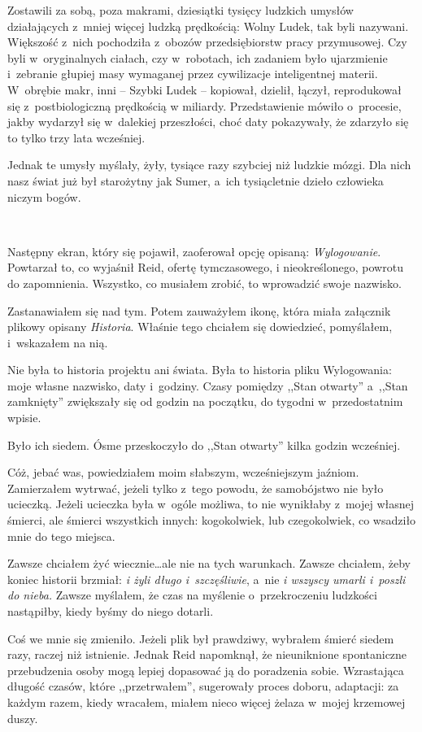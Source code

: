 \documentclass[oneside,polish,11pt,sfheadings]{mwbk}
\begin{document}
Zostawili za sobą, poza makrami, dziesiątki tysięcy ludzkich umysłów
działających z~mniej więcej ludzką prędkością: Wolny Ludek, tak byli
nazywani. Większość z~nich pochodziła z~obozów przedsiębiorstw pracy
przymusowej. Czy byli w~oryginalnych ciałach, czy w~robotach, ich
zadaniem było ujarzmienie i~zebranie głupiej masy wymaganej przez
cywilizacje inteligentnej materii. W~obrębie makr, inni -- Szybki Ludek -- kopiował, dzielił, łączył, reprodukował się z~postbiologiczną prędkością
w miliardy. Przedstawienie mówiło o~procesie, jakby wydarzył się w~dalekiej przeszłości, choć daty pokazywały, że zdarzyło się to tylko
trzy lata wcześniej.

Jednak te umysły myślały, żyły, tysiące razy szybciej niż ludzkie mózgi.
Dla nich nasz świat już był starożytny jak Sumer, a~ich tysiącletnie
dzieło człowieka niczym bogów.

~

Następny ekran, który się pojawił, zaoferował opcję opisaną:
\emph{Wylogowanie}. Powtarzał to, co wyjaśnił Reid, ofertę tymczasowego,
i nieokreślonego, powrotu do zapomnienia. Wszystko, co musiałem zrobić,
to wprowadzić swoje nazwisko.

Zastanawiałem się nad tym. Potem zauważyłem ikonę, która miała załącznik
plikowy opisany \emph{Historia}. Właśnie tego chciałem się dowiedzieć,
pomyślałem, i~wskazałem na nią.

Nie była to historia projektu ani świata. Była to historia pliku
Wylogowania: moje własne nazwisko, daty i~godziny. Czasy pomiędzy ,,Stan
otwarty'' a~,,Stan zamknięty'' zwiększały się od godzin na początku, do
tygodni w~przedostatnim wpisie.

Było ich siedem. Ósme przeskoczyło do ,,Stan otwarty'' kilka godzin
wcześniej.

Cóż, jebać was, powiedziałem moim słabszym, wcześniejszym jaźniom.
Zamierzałem wytrwać, jeżeli tylko z~tego powodu, że samobójstwo nie było
ucieczką. Jeżeli ucieczka była w~ogóle możliwa, to nie wynikłaby z~mojej
własnej śmierci, ale śmierci wszystkich innych: kogokolwiek, lub
czegokolwiek, co wsadziło mnie do tego miejsca.

Zawsze chciałem żyć wiecznie\ldots ale nie na tych warunkach. Zawsze
chciałem, żeby koniec historii brzmiał: \emph{i żyli długo i~szczęśliwie}, a~nie \emph{i wszyscy umarli i~poszli do nieba.} Zawsze
myślałem, że czas na myślenie o~przekroczeniu ludzkości nastąpiłby,
kiedy byśmy do niego dotarli.

Coś we mnie się zmieniło. Jeżeli plik był prawdziwy, wybrałem śmierć
siedem razy, raczej niż istnienie. Jednak Reid napomknął, że
nieuniknione spontaniczne przebudzenia osoby mogą lepiej dopasować ją do
poradzenia sobie. Wzrastająca długość czasów, które ,,przetrwałem'',
sugerowały proces doboru, adaptacji: za każdym razem, kiedy wracałem,
miałem nieco więcej żelaza w~mojej krzemowej duszy.
\end{document}
